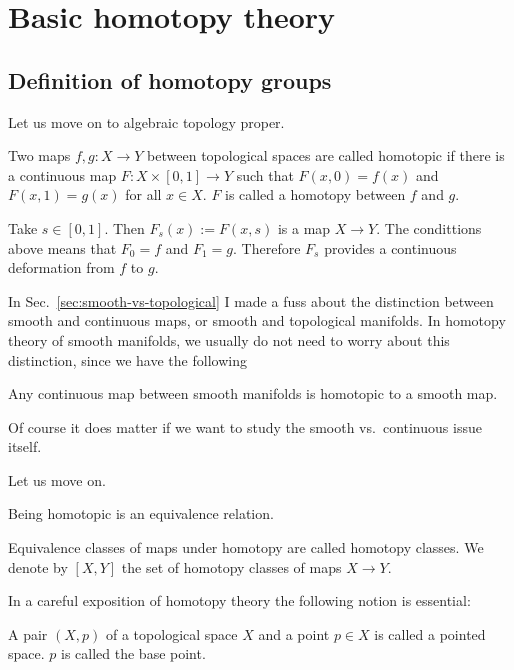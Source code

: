 \documentclass[12pt]{article}
\numberwithin{equation}{section}
\numberwithin{figure}{section}
\theoremstyle{remark}
\begin{document}
\section{Basic homotopy theory}
\label{sec:basic-homotopy}


\subsection{Definition of homotopy groups}

Let us move on to algebraic topology proper. 

\begin{definition}
Two maps $f,g:X\to Y$ between topological spaces are called homotopic
if there is a continuous map $F:X\times [0,1]\to Y$ such that
$F(x,0)=f(x)$ and $F(x,1)=g(x)$ for all $x\in X$.
$F$ is called a homotopy between $f$ and $g$.
\end{definition}

Take $s\in [0,1]$.
Then $F_s(x):=F(x,s)$ is a map $X\to Y$.
The condittions above means that $F_0=f$ and $F_1=g$.
Therefore $F_s$ provides a continuous deformation from $f$ to $g$.


In Sec.~\ref{sec:smooth-vs-topological} I made a fuss about the distinction between smooth and continuous maps, 
or smooth and topological manifolds.
In homotopy theory of smooth manifolds, 
we usually do not need to worry about this distinction,
since we have the following
\begin{fact}
Any continuous map between smooth manifolds is homotopic to a smooth map.
\end{fact}
Of course it does matter if we want to study the smooth vs.~continuous issue itself.

Let us move on.
\begin{proposition}
  Being homotopic is an equivalence relation.
\end{proposition}

\begin{definition}
  Equivalence classes of maps under homotopy are called homotopy classes.
  We denote by $[X,Y]$ the set of homotopy classes of maps $X\to Y$.
\end{definition}


In a careful exposition of homotopy theory the following notion is essential:

\begin{definition}
  A pair $(X,p)$ of a topological space $X$ and a point $p\in X$ is called a pointed space.
  $p$ is called the base point. 
\end{definition}
\end{document}
